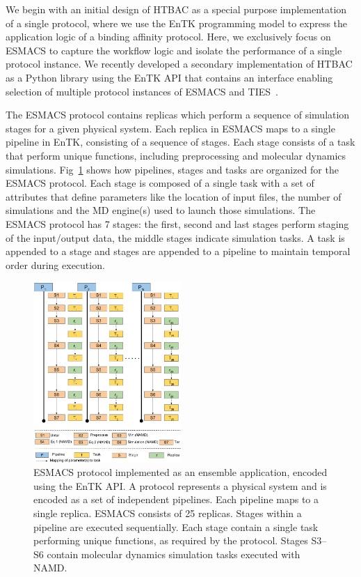 We begin with an initial design of HTBAC as a special purpose implementation
of a single protocol, where we use the EnTK programming model to express the
application logic of a binding affinity protocol. Here, we exclusively focus
on ESMACS to capture the workflow logic and isolate the performance of a
single protocol instance. We recently developed a secondary implementation of
HTBAC as a Python library using the EnTK API that contains an interface
enabling selection of multiple protocol instances of ESMACS and
TIES~\cite{dakka}.

The ESMACS protocol contains replicas which perform a sequence of simulation
stages for a given physical system. Each replica in ESMACS maps to a single
pipeline in EnTK, consisting of a sequence of stages. Each stage consists of
a task that perform unique functions, including preprocessing and molecular
dynamics simulations. Fig~\ref{figure:HTBAC} shows how pipelines, stages and
tasks are organized for the ESMACS protocol. Each stage is composed of a
single task with a set of attributes that define parameters like the location
of input files, the number of simulations and the MD engine(s) used to launch
those simulations. The ESMACS protocol has 7 stages: the first, second and
last stages perform staging of the input/output data, the middle stages
indicate simulation tasks. A task is appended to a stage and stages are
appended to a pipeline to maintain temporal order during execution.

\begin{figure}
\centering
  \includegraphics[width=0.5\textwidth]{FIGURES/HTBAC_Workflow_ESMACS.pdf}
  \caption{ESMACS protocol implemented as an ensemble application, encoded
  using the EnTK API\@. A protocol represents a physical system and is
  encoded as a set of independent pipelines. Each pipeline maps to a single
  replica. ESMACS consists of 25 replicas. Stages within a pipeline are
  executed sequentially. Each stage contain a single task performing unique
  functions, as required by the protocol. Stages S3--S6 contain molecular
  dynamics simulation tasks executed with NAMD\@.}\label{figure:HTBAC}
\end{figure}

